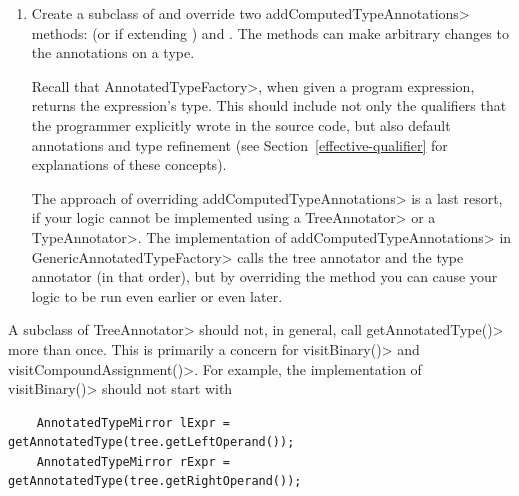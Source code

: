 \begin{enumerate}
\item
  Create a subclass of  and
  override two \<addComputedTypeAnnotations> methods:
  (or
  if extending )
  and
  .
  The methods can make arbitrary changes to the annotations on a type.

  Recall that \<AnnotatedTypeFactory>, when given a program
  expression, returns the expression's type.  This should include not only
  the qualifiers that the programmer explicitly wrote in the source code, but
  also default annotations and type
  refinement (see Section~\ref{effective-qualifier} for explanations of these
  concepts).

  The approach of overriding \<addComputedTypeAnnotations> is a last
  resort, if your logic cannot be implemented using a \<TreeAnnotator> or a
  \<TypeAnnotator>.  The implementation of \<addComputedTypeAnnotations> in
  \<GenericAnnotatedTypeFactory> calls the tree annotator and the type
  annotator (in that order), but by overriding the method you can cause
  your logic to be run even earlier or even later.

\end{enumerate}



A subclass of \<TreeAnnotator> should not, in general, call
\<getAnnotatedType()> more than once.
This is primarily a concern for \<visitBinary()> and \<visitCompoundAssignment()>.
For example, the implementation of \<visitBinary()> should not start with

\begin{Verbatim}
    AnnotatedTypeMirror lExpr = getAnnotatedType(tree.getLeftOperand());
    AnnotatedTypeMirror rExpr = getAnnotatedType(tree.getRightOperand());
\end{Verbatim}

